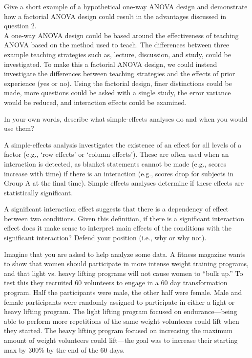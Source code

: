 \documentclass[onecolumn,10pt]{jhwhw}
\begin{document}
\problem{}
Give a short example of a hypothetical one-way ANOVA design and demonstrate how a factorial ANOVA design could result in the advantages discussed in question 2.\\

A one-way ANOVA design could be based around the effectiveness of teaching ANOVA based on the method used to teach. The differences between three example teaching strategies such as, lecture, discussion, and study, could be investigated. To make this a factorial ANOVA design, we could instead investigate the differences between teaching strategies and the effects of prior experience (yes or no). Using the factorial design, finer distinctions could be made, more questions could be asked with a single study, the error variance would be reduced, and interaction effects could be examined.

\problem{}
In your own words, describe what simple-effects analyses do and when you would use them?

A simple-effects analysis investigates the existence of an effect for all levels of a factor (e.g., `row effects' or `column effects'). These are often used when an interaction is detected, as blanket statements cannot be made (e.g., scores increase with time) if there is an interaction (e.g., scores drop for subjects in Group A at the final time). Simple effects analyses determine if these effects are statistically significant.

\problem{}
A significant interaction effect suggests that there is a dependency of effect between two conditions. Given this definition, if there is a significant interaction effect does it make sense to interpret main effects of the conditions with the significant interaction? Defend your position (i.e., why or why not).

\problem{}
Imagine that you are asked to help analyze some data. A fitness magazine wants to show that women should participate in more intense weight training programs, and that light vs. heavy lifting programs will not cause women to ``bulk up.'' To test this they recruited 60 volunteers to engage in a 60 day transformation program. Half the participants were male, the other half were female. Male and female participants were randomly assigned to participate in either a light or heavy lifting program. The light lifting program focused on endurance---being able to perform more repetitions of the same weight volunteers could lift when they started. The heavy lifting program focused on increasing the maximum amount of weight volunteers could lift---the goal was to increase their starting max by 300\% by the end of the 60 days.
\end{document}
